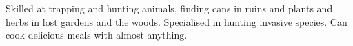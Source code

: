 \begin{npcBox}[title=Gutenberg a Lost trapper and cook]
    \begin{stunts}
    \item {}
    \end{stunts}
    
    \begin{stressSection}
    \end{stressSection}
    \begin{tabularx}{\textwidth}{ XX }
    \end{tabularx}
    
    \begin{consequences}
    \item {}
    \item {}
    \item {}
    \end{consequences}
    
    \begin{npcDescription}
    Skilled at trapping and hunting animals, finding cans in ruins and plants and herbs in lost gardens and the woods. Specialised in hunting invasive species. Can cook delicious meals with almost anything.
    \end{npcDescription}
    
\end{npcBox}



